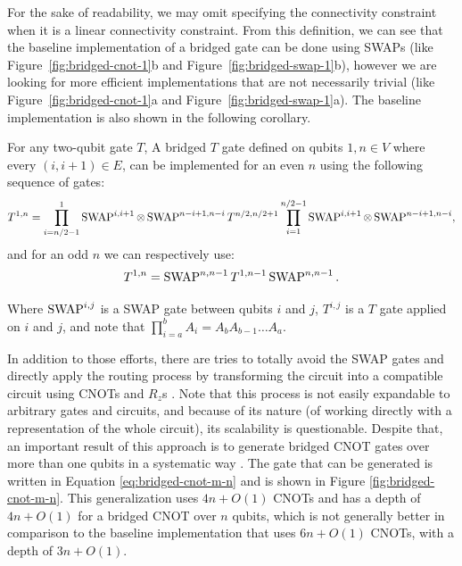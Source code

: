 For the sake of readability, we may omit specifying the connectivity constraint when it is a linear connectivity constraint. From this definition, we can see that the baseline implementation of a bridged gate can be done using SWAPs (like Figure~\ref{fig:bridged-cnot-1}b and Figure~\ref{fig:bridged-swap-1}b), however we are looking for more efficient implementations that are not necessarily trivial (like Figure~\ref{fig:bridged-cnot-1}a and Figure~\ref{fig:bridged-swap-1}a). The baseline implementation is also shown in the following corollary.

\begin{corollary}\label{cor:baseline-bridged}
  For any two-qubit gate $T$, A bridged $T$ gate defined on qubits $1, n \in V$ where every $(i, i + 1) \in E$, can be implemented for an even $n$ using the following sequence of gates:
  \begin{equation}
    T^{1,n} = \prod_{i=n/2-1}^{1} \operatorname{SWAP}^{i,i+1} \otimes \operatorname{SWAP}^{n-i+1, n-i} T^{n/2, n/2+1} \prod_{i=1}^{n/2-1} \operatorname{SWAP}^{i,i+1} \otimes \operatorname{SWAP}^{n-i+1, n-i},
  \end{equation}
  and for an odd $n$ we can respectively use:
  \begin{equation}
    T^{1,n} = \operatorname{SWAP}^{n,n-1} T^{1,n-1} \operatorname{SWAP}^{n,n-1}.
  \end{equation}

  Where $\operatorname{SWAP}^{i,j}$ is a SWAP gate between qubits $i$ and $j$, $T^{i,j}$ is a $T$ gate applied on $i$ and $j$, and note that $\prod_{i=a}^b A_i = A_b A_{b-1} \dots A_a$.
\end{corollary}

In addition to those efforts, there are tries to totally avoid the SWAP gates and directly apply the routing process by transforming the circuit into a compatible circuit using CNOTs and $R_z$s \cite{nash2020,kissinger2019}. Note that this process is not easily expandable to arbitrary gates and circuits, and because of its nature (of working directly with a representation of the whole circuit), its scalability is questionable. Despite that, an important result of this approach is to generate bridged CNOT gates over more than one qubits in a systematic way \cite{nash2020}. The gate that can be generated is written in Equation \ref{eq:bridged-cnot-m-n} and is shown in Figure \ref{fig:bridged-cnot-m-n}. This generalization uses $4n + O(1)$ CNOTs and has a depth of $4n + O(1)$ for a bridged CNOT over $n$ qubits, which is not generally better in comparison to the baseline implementation that uses $6n + O(1)$ CNOTs, with a depth of $3n + O(1)$.

